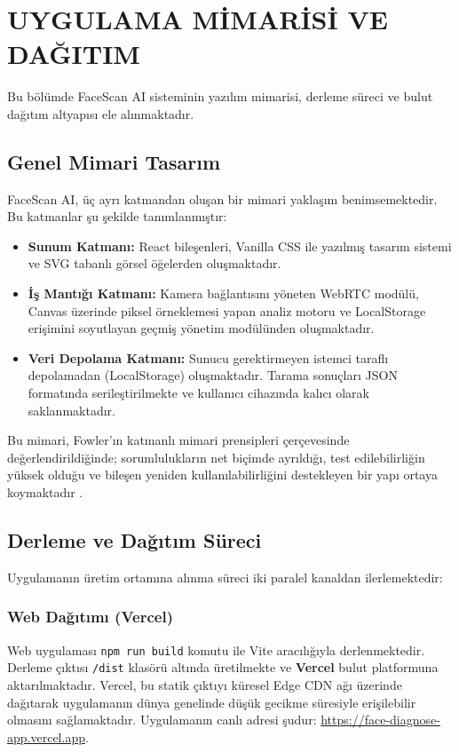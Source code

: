 \section{UYGULAMA MİMARİSİ VE DAĞITIM}

Bu bölümde FaceScan AI sisteminin yazılım mimarisi, derleme süreci ve bulut dağıtım altyapısı ele alınmaktadır.

\subsection{Genel Mimari Tasarım}

FaceScan AI, üç ayrı katmandan oluşan bir mimari yaklaşım benimsemektedir. Bu katmanlar şu şekilde tanımlanmıştır:

\begin{itemize}
  \item \textbf{Sunum Katmanı:} React bileşenleri, Vanilla CSS ile yazılmış tasarım sistemi ve SVG tabanlı görsel öğelerden oluşmaktadır.
  \item \textbf{İş Mantığı Katmanı:} Kamera bağlantısını yöneten WebRTC modülü, Canvas üzerinde piksel örneklemesi yapan analiz motoru ve LocalStorage erişimini soyutlayan geçmiş yönetim modülünden oluşmaktadır.
  \item \textbf{Veri Depolama Katmanı:} Sunucu gerektirmeyen istemci taraflı depolamadan (LocalStorage) oluşmaktadır. Tarama sonuçları JSON formatında serileştirilmekte ve kullanıcı cihazında kalıcı olarak saklanmaktadır.
\end{itemize}

Bu mimari, Fowler'ın katmanlı mimari prensipleri çerçevesinde değerlendirildiğinde; sorumlulukların net biçimde ayrıldığı, test edilebilirliğin yüksek olduğu ve bileşen yeniden kullanılabilirliğini destekleyen bir yapı ortaya koymaktadır \cite{react2023component}.

\subsection{Derleme ve Dağıtım Süreci}

Uygulamanın üretim ortamına alınma süreci iki paralel kanaldan ilerlemektedir:

\subsubsection{Web Dağıtımı (Vercel)}
Web uygulaması \texttt{npm run build} komutu ile Vite aracılığıyla derlenmektedir. Derleme çıktısı \texttt{/dist} klasörü altında üretilmekte ve \textbf{Vercel} bulut platformuna aktarılmaktadır. Vercel, bu statik çıktıyı küresel Edge CDN ağı üzerinde dağıtarak uygulamanın dünya genelinde düşük gecikme süresiyle erişilebilir olmasını sağlamaktadır. Uygulamanın canlı adresi şudur: \url{https://face-diagnose-app.vercel.app}.

